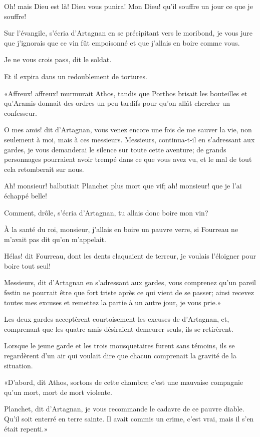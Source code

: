 \speak  Oh! mais Dieu est là! Dieu vous punira! Mon Dieu! qu'il souffre un jour ce que je souffre! 

\speak  Sur l'évangile, s'écria d'Artagnan en se précipitant vers le moribond, je vous jure que j'ignorais que ce vin fût empoisonné et que j'allais en boire comme vous. 

\speak  Je ne vous crois pas», dit le soldat. 

Et il expira dans un redoublement de tortures. 

«Affreux! affreux! murmurait Athos, tandis que Porthos brisait les bouteilles et qu'Aramis donnait des ordres un peu tardifs pour qu'on allât chercher un confesseur. 

\speak  O mes amis! dit d'Artagnan, vous venez encore une fois de me sauver la vie, non seulement à moi, mais à ces messieurs. Messieurs, continua-t-il en s'adressant aux gardes, je vous demanderai le silence sur toute cette aventure; de grands personnages pourraient avoir trempé dans ce que vous avez vu, et le mal de tout cela retomberait sur nous. 

\speak  Ah! monsieur! balbutiait Planchet plus mort que vif; ah! monsieur! que je l'ai échappé belle! 

\speak  Comment, drôle, s'écria d'Artagnan, tu allais donc boire mon vin? 

\speak  À la santé du roi, monsieur, j'allais en boire un pauvre verre, si Fourreau ne m'avait pas dit qu'on m'appelait. 

\speak  Hélas! dit Fourreau, dont les dents claquaient de terreur, je voulais l'éloigner pour boire tout seul! 

\speak  Messieurs, dit d'Artagnan en s'adressant aux gardes, vous comprenez qu'un pareil festin ne pourrait être que fort triste après ce qui vient de se passer; ainsi recevez toutes mes excuses et remettez la partie à un autre jour, je vous prie.» 

Les deux gardes acceptèrent courtoisement les excuses de d'Artagnan, et, comprenant que les quatre amis désiraient demeurer seuls, ils se retirèrent. 

Lorsque le jeune garde et les trois mousquetaires furent sans témoins, ils se regardèrent d'un air qui voulait dire que chacun comprenait la gravité de la situation. 

«D'abord, dit Athos, sortons de cette chambre; c'est une mauvaise compagnie qu'un mort, mort de mort violente. 

\speak  Planchet, dit d'Artagnan, je vous recommande le cadavre de ce pauvre diable. Qu'il soit enterré en terre sainte. Il avait commis un crime, c'est vrai, mais il s'en était repenti.» 

